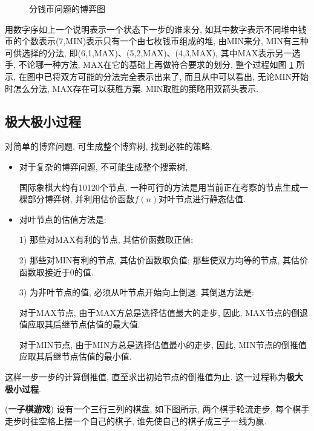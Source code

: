 \begin{answer}
\begin{figure}[H]
\begin{center}
\end{center}
\vspace{-0.5cm}
\caption{分钱币问题的博弈图}
\label{AI32fig001}
\end{figure}
用数字序如上一个说明表示一个状态下一步的谁来分, 如其中数字表示不同堆中钱币的个数表示(7,MIN)表示只有一个由七枚钱币组成的堆, 由MIN来分,
MIN有三种可供选择的分法, 即(6,1,MAX)、(5,2,MAX)、(4,3,MAX), 其中MAX表示另一选手, 不论哪一种方法, MAX在它的基础上再做符合要求的划分,
整个过程如图 \ref{AI32fig001} 所示, 在图中已将双方可能的分法完全表示出来了, 而且从中可以看出, 无论MIN开始时怎么分法, MAX存在可以获胜方案.
MIN取胜的策略用双箭头表示.
\end{answer}
\subsection{极大极小过程}
    对简单的博弈问题, 可生成整个博弈树, 找到必胜的策略.
\begin{itemize}
\item 对于复杂的博弈问题, 不可能生成整个搜索树,
\begin{example}
    国际象棋大约有10120个节点.
    一种可行的方法是用当前正在考察的节点生成一棵部分博弈树, 并利用估价函数$f(n)$对叶节点进行静态估值.
\end{example}
\item 对叶节点的估值方法是:

1) 那些对MAX有利的节点, 其估价函数取正值;

2) 那些对MIN有利的节点, 其估价函数取负值; 那些使双方均等的节点, 其估价函数取接近于0的值.

3) 为非叶节点的值, 必须从叶节点开始向上倒退. 其倒退方法是:

   \qquad{} 对于MAX节点, 由于MAX方总是选择估值最大的走步, 因此, MAX节点的倒退值应取其后继节点估值的最大值.

   \qquad{} 对于MIN节点, 由于MIN方总是选择估值最小的走步, 因此, MIN节点的倒推值应取其后继节点估值的最小值.
\end{itemize}
这样一步一步的计算倒推值, 直至求出初始节点的倒推值为止. 这一过程称为\textbf{极大极小过程}.
\begin{example}
    (\textbf{一子棋游戏}) 设有一个三行三列的棋盘, 如下图所示, 两个棋手轮流走步, 每个棋手走步时往空格上摆一个自己的棋子, 谁先使自己的棋子成三子一线为赢.
\end{example}

